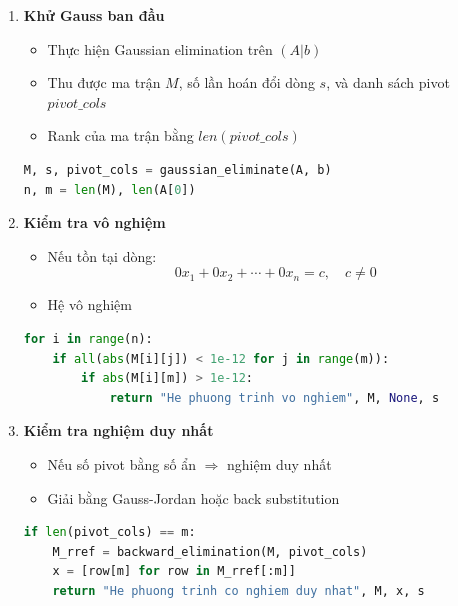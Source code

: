 \documentclass[a4paper,12pt]{report}
\begin{document}
\begin{enumerate}

\item \textbf{Khử Gauss ban đầu}

\begin{itemize}
    \item Thực hiện Gaussian elimination trên $(A|b)$
    \item Thu được ma trận $M$, số lần hoán đổi dòng $s$, và danh sách pivot $pivot\_cols$
    \item Rank của ma trận bằng $len(pivot\_cols)$
\end{itemize}

\begin{lstlisting}[language=Python, caption={Khử Gauss}]
M, s, pivot_cols = gaussian_eliminate(A, b)
n, m = len(M), len(A[0])
\end{lstlisting}

\item \textbf{Kiểm tra vô nghiệm}

\begin{itemize}
    \item Nếu tồn tại dòng:
    \[
    0x_1 + 0x_2 + \cdots + 0x_n = c,\quad c \neq 0
    \]
    \item Hệ vô nghiệm
\end{itemize}

\begin{lstlisting}[language=Python, caption={Kiểm tra vô nghiệm}]
for i in range(n):
    if all(abs(M[i][j]) < 1e-12 for j in range(m)):
        if abs(M[i][m]) > 1e-12:
            return "He phuong trinh vo nghiem", M, None, s
\end{lstlisting}

\item \textbf{Kiểm tra nghiệm duy nhất}

\begin{itemize}
    \item Nếu số pivot bằng số ẩn $\Rightarrow$ nghiệm duy nhất
    \item Giải bằng Gauss-Jordan hoặc back substitution
\end{itemize}

\begin{lstlisting}[language=Python, caption={Nghiệm duy nhất}]
if len(pivot_cols) == m:
    M_rref = backward_elimination(M, pivot_cols)
    x = [row[m] for row in M_rref[:m]]
    return "He phuong trinh co nghiem duy nhat", M, x, s
\end{lstlisting}


\end{enumerate}
\end{document}
